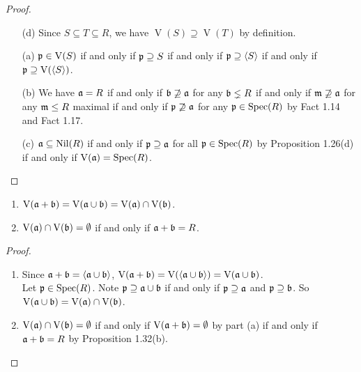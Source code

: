 \begin{proof}
    \begin{enumerate} 
        \item [(d)] Since $S \subseteq T \subseteq R$, we have $\operatorname{V}(S) \supseteq \operatorname{V}(T)$ by definition.
        \item [(a)] $\mathfrak{p} \in \operatorname{V}(S)$ if and only if $\mathfrak{p} \supseteq S$ if and only if $\mathfrak{p} \supseteq \langle S \rangle$ if and only if $\mathfrak{p} \supseteq \operatorname{V}(\langle S \rangle)$.
        \item [(b)]
            We have $\mathfrak{a} = R$ if and only if $\mathfrak{b} \not \supseteq \mathfrak{a}$ for any $\mathfrak{b} \lneq R$ if and only if $\mathfrak{m} \not \supseteq \mathfrak{a}$ for any $\mathfrak{m} \leq R$ maximal if and only if $\mathfrak{p} \not \supseteq \mathfrak{a}$ for any $\mathfrak{p} \in \operatorname{Spec}(R)$ by Fact 1.14 and Fact 1.17. 
        \item[(c)] $\mathfrak{a} \subseteq \operatorname{Nil}(R)$ if and only if $\mathfrak{p} \supseteq \mathfrak{a}$ for all $\mathfrak{p} \in \operatorname{Spec}(R)$ by Proposition 1.26(d) if and only if $\operatorname{V}(\mathfrak{a}) = \operatorname{Spec}(R)$. \qedhere
    \end{enumerate}
\end{proof}

\begin{proposition}
    \begin{enumerate}
        \item $\operatorname{V}(\mathfrak{a} + \mathfrak{b}) = \operatorname{V}(\mathfrak{a} \cup \mathfrak{b}) = \operatorname{V}(\mathfrak{a}) \cap \operatorname{V}(\mathfrak{b})$.
        \item $\operatorname{V}(\mathfrak{a}) \cap \operatorname{V}(\mathfrak{b}) = \emptyset$ if and only if $\mathfrak{a} + \mathfrak{b} = R$.
    \end{enumerate}
\end{proposition}

\begin{proof}
    \begin{enumerate}
        \item 
            Since $\mathfrak{a} + \mathfrak{b} = \langle \mathfrak{a} \cup \mathfrak{b} \rangle$, $\operatorname{V}(\mathfrak{a} + \mathfrak{b}) = \operatorname{V}(\langle \mathfrak{a} \cup \mathfrak{b} \rangle) = \operatorname{V}(\mathfrak{a} \cup \mathfrak{b})$. \\
            Let $\mathfrak{p} \in \operatorname{Spec}(R)$. Note $\mathfrak{p} \supseteq \mathfrak{a} \cup \mathfrak{b}$ if and only if $\mathfrak{p} \supseteq \mathfrak{a}$ and $\mathfrak{p} \supseteq \mathfrak{b}$. So $\operatorname{V}(\mathfrak{a} \cup \mathfrak{b}) = \operatorname{V}(\mathfrak{a}) \cap \operatorname{V}(\mathfrak{b})$.
        \item 
            $\operatorname{V}(\mathfrak{a}) \cap \operatorname{V}(\mathfrak{b}) = \emptyset$ if and only if $\operatorname{V}(\mathfrak{a} + \mathfrak{b}) = \emptyset$ by part (a) if and only if $\mathfrak{a} + \mathfrak{b} = R$ by Proposition 1.32(b). \qedhere
    \end{enumerate}
\end{proof}

